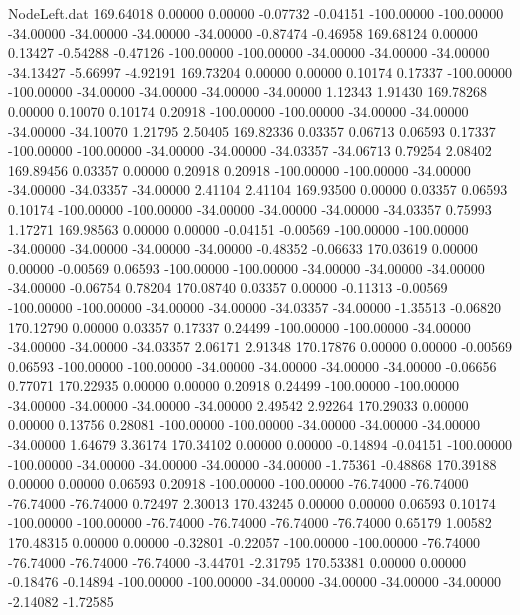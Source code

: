\begin{filecontents}{NodeLeft.dat}
 169.64018    0.00000    0.00000    -0.07732   -0.04151 -100.00000 -100.00000  -34.00000  -34.00000  -34.00000  -34.00000   -0.87474   -0.46958
 169.68124    0.00000    0.13427    -0.54288   -0.47126 -100.00000 -100.00000  -34.00000  -34.00000  -34.00000  -34.13427   -5.66997   -4.92191
 169.73204    0.00000    0.00000     0.10174    0.17337 -100.00000 -100.00000  -34.00000  -34.00000  -34.00000  -34.00000    1.12343    1.91430
 169.78268    0.00000    0.10070     0.10174    0.20918 -100.00000 -100.00000  -34.00000  -34.00000  -34.00000  -34.10070    1.21795    2.50405
 169.82336    0.03357    0.06713     0.06593    0.17337 -100.00000 -100.00000  -34.00000  -34.00000  -34.03357  -34.06713    0.79254    2.08402
 169.89456    0.03357    0.00000     0.20918    0.20918 -100.00000 -100.00000  -34.00000  -34.00000  -34.03357  -34.00000    2.41104    2.41104
 169.93500    0.00000    0.03357     0.06593    0.10174 -100.00000 -100.00000  -34.00000  -34.00000  -34.00000  -34.03357    0.75993    1.17271
 169.98563    0.00000    0.00000    -0.04151   -0.00569 -100.00000 -100.00000  -34.00000  -34.00000  -34.00000  -34.00000   -0.48352   -0.06633
 170.03619    0.00000    0.00000    -0.00569    0.06593 -100.00000 -100.00000  -34.00000  -34.00000  -34.00000  -34.00000   -0.06754    0.78204
 170.08740    0.03357    0.00000    -0.11313   -0.00569 -100.00000 -100.00000  -34.00000  -34.00000  -34.03357  -34.00000   -1.35513   -0.06820
 170.12790    0.00000    0.03357     0.17337    0.24499 -100.00000 -100.00000  -34.00000  -34.00000  -34.00000  -34.03357    2.06171    2.91348
 170.17876    0.00000    0.00000    -0.00569    0.06593 -100.00000 -100.00000  -34.00000  -34.00000  -34.00000  -34.00000   -0.06656    0.77071
 170.22935    0.00000    0.00000     0.20918    0.24499 -100.00000 -100.00000  -34.00000  -34.00000  -34.00000  -34.00000    2.49542    2.92264
 170.29033    0.00000    0.00000     0.13756    0.28081 -100.00000 -100.00000  -34.00000  -34.00000  -34.00000  -34.00000    1.64679    3.36174
 170.34102    0.00000    0.00000    -0.14894   -0.04151 -100.00000 -100.00000  -34.00000  -34.00000  -34.00000  -34.00000   -1.75361   -0.48868
 170.39188    0.00000    0.00000     0.06593    0.20918 -100.00000 -100.00000  -76.74000  -76.74000  -76.74000  -76.74000    0.72497    2.30013
 170.43245    0.00000    0.00000     0.06593    0.10174 -100.00000 -100.00000  -76.74000  -76.74000  -76.74000  -76.74000    0.65179    1.00582
 170.48315    0.00000    0.00000    -0.32801   -0.22057 -100.00000 -100.00000  -76.74000  -76.74000  -76.74000  -76.74000   -3.44701   -2.31795
 170.53381    0.00000    0.00000    -0.18476   -0.14894 -100.00000 -100.00000  -34.00000  -34.00000  -34.00000  -34.00000   -2.14082   -1.72585

\end{filecontents}
